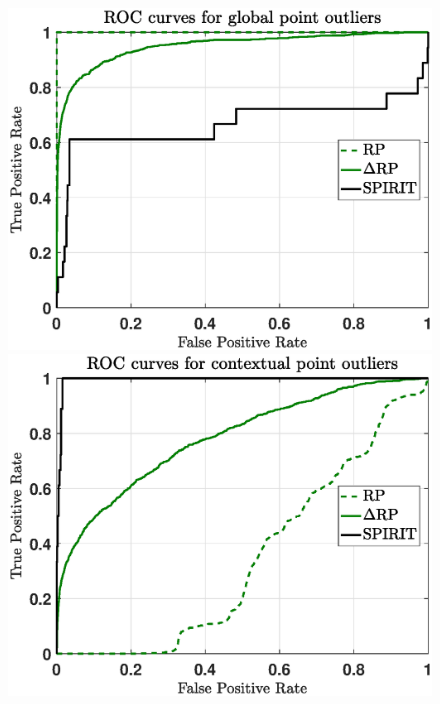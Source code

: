 \begin{figure}[h]
	\begin{minipage}{0.333\textwidth}
		\centering
		\includegraphics[scale=0.28]{analysis/ROCs_point_scaled}
	\end{minipage}
	\begin{minipage}{0.333\textwidth}
		\centering
		\includegraphics[scale=0.28]{analysis/ROCs_contextual_scaled}
	\end{minipage}
	\begin{minipage}{0.333\textwidth}
		\centering

\end{minipage}
\end{figure}
